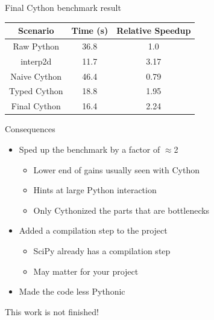 \documentclass[12pt,xcolor=dvipsnames]{beamer}
\begin{document}
    \begin{frame}{Final Cython benchmark result}
        \begin{center}
        \begin{tabular}{ | c | c | c | }
            \hline
            Scenario & Time (s) & Relative Speedup \\
            \hline
            Raw Python & 36.8 & 1.0 \\
            interp2d & 11.7 & 3.17 \\
            Naive Cython & 46.4 & 0.79 \\
            Typed Cython & 18.8 & 1.95 \\
            Final Cython & 16.4 & 2.24 \\
            \hline
        \end{tabular}
        \end{center}
    \end{frame}

    \begin{frame}{Consequences}
        \begin{itemize}
            \item Sped up the benchmark by a factor of $\approx$2
            \begin{itemize}
                \item Lower end of gains usually seen with Cython
                \item Hints at large Python interaction
                \item Only Cythonized the parts that are bottlenecks
            \end{itemize}
            \item Added a compilation step to the project
            \begin{itemize}
                \item SciPy already has a compilation step
                \item May matter for your project
            \end{itemize}
            \item Made the code less Pythonic
        \end{itemize}
    \end{frame}

    \begin{frame}
        This work is not finished!
    \end{frame}
\end{document}
